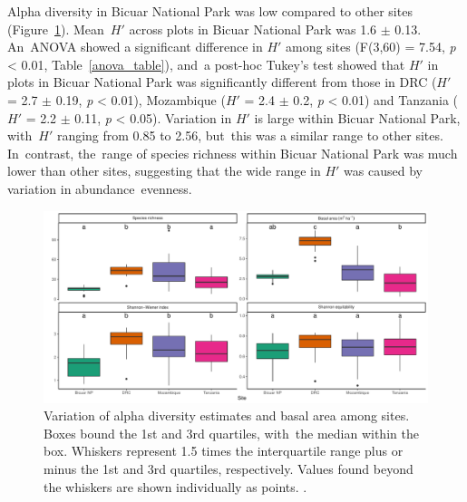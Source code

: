 \documentclass[diversity,article,accept,moreauthors,pdftex]{Definitions/mdpi}
\newcommand{\bicuarshannon}{1.6 $\pm$ 0.13}
\newcommand{\nhamshannon}{2.4 $\pm$ 0.2}
\newcommand{\kilwashannon}{2.2 $\pm$ 0.11}
\newcommand{\drcshannon}{2.7 $\pm$ 0.19}
\newcommand{\bicuarminshannon}{0.85}
\newcommand{\bicuarmaxshannon}{2.56}
\newcommand{\tukeyshannonbicuardrc}{\emph{p} < 0.01}
\newcommand{\tukeyshannonbicuarkilwa}{\emph{p} < 0.05}
\newcommand{\tukeyshannonbicuarnham}{\emph{p} < 0.01}
\newcommand{\lmshannon}{F(3,60) = 7.54, \emph{p} < 0.01}
\begin{document}
Alpha diversity in Bicuar National Park was low compared to other sites (Figure~\ref{div_box}). Mean~$H'$ across plots in Bicuar National Park was \bicuarshannon{}. An~ANOVA showed a significant difference in $H'$ among sites (\lmshannon{}, Table~\ref{anova_table}), and~a post-hoc Tukey's test showed that $H'$ in plots in Bicuar National Park was significantly different from those in DRC ($H'$ = \drcshannon{}, \tukeyshannonbicuardrc{}), Mozambique ($H'$ = \nhamshannon{}, \tukeyshannonbicuarnham{}) and Tanzania ($H'$ = \kilwashannon{}, \tukeyshannonbicuarkilwa{}). Variation in $H'$ is large within Bicuar National Park, with~$H'$ ranging from \bicuarminshannon{} to \bicuarmaxshannon{}, but~this was a similar range to other sites. In~contrast, the~range of species richness within Bicuar National Park was much lower than other sites, suggesting that the wide range in $H'$ was caused by variation in abundance~evenness.

\begin{figure}[H]
\centering
	\includegraphics[width=\textwidth]{img/div_box}
	\caption{Variation of alpha diversity estimates and basal area among sites. Boxes bound the 1st and 3rd quartiles, with~the median within the box. Whiskers represent 1.5 times the interquartile range plus or minus the 1st and 3rd quartiles, respectively. Values found beyond the whiskers are shown individually as points. .}
    \label{div_box}
\end{figure}
\unskip
\end{document}
